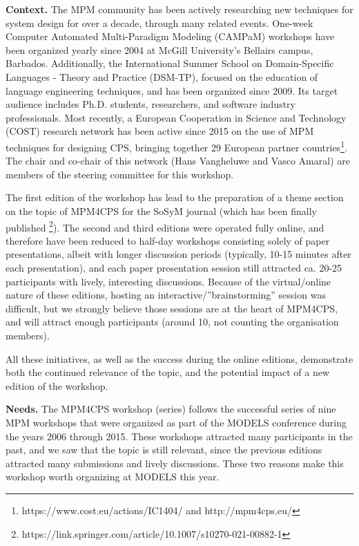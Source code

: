 \smallskip
\noindent
\textbf{Context.}
%
The MPM community has been actively researching new techniques for system design 
for over a decade, through many related events.
One-week Computer Automated Multi-Paradigm Modeling (CAMPaM) workshops have been 
organized yearly since 2004 at McGill University’s Bellairs campus, Barbados. 
Additionally, the International Summer School on Domain-Specific Languages - 
Theory and Practice (DSM-TP), focused on the education of language engineering 
techniques, and has been organized since 2009.
Its target audience includes Ph.D. students, researchers, and software industry 
professionals.
Most recently, a European Cooperation in Science and Technology (COST) research 
network has been active since 2015 on the use of MPM techniques for designing 
CPS, bringing together 29 European partner countries\footnote{https://www.cost.eu/actions/IC1404/ 
and http://mpm4cps.eu/}.
The chair and co-chair of this network (Hans Vangheluwe and Vasco Amaral) are 
members of the steering committee for this workshop.

The first edition of the workshop has lead to the preparation of a theme section
on the topic of MPM4CPS for the SoSyM journal (which has been finally published%
\footnote{ https://link.springer.com/article/10.1007/s10270-021-00882-1}).
The second and third editions were operated fully online, and therefore have been
reduced to half-day workshops consisting solely of paper presentations, albeit with
longer discussion periods (typically, 10-15 minutes after each presentation), and
each paper presentation session still attracted ca. 20-25 participants with lively,
interesting discussions. Because of the virtual/online nature of these editions,
hosting an interactive/''brainstorming'' session was difficult, but we strongly
believe those sessions are at the heart of MPM4CPS, and will attract enough
participants (around 10, not counting the organisation members).

All these initiatives, as well as the success during the online editions, 
demonstrate both the continued relevance of the topic, and the 
potential impact of a new edition of the workshop.




\smallskip
\noindent
\textbf{Needs.}
%
The MPM4CPS workshop (series) follows the successful series of nine MPM workshops that 
were organized as part of the MODELS conference during the years 2006 through 2015.
These workshops attracted many participants in the past, and we saw that the topic
is still relevant, since the previous editions attracted many submissions and lively discussions.
These two reasons make this workshop worth organizing at MODELS this year.

